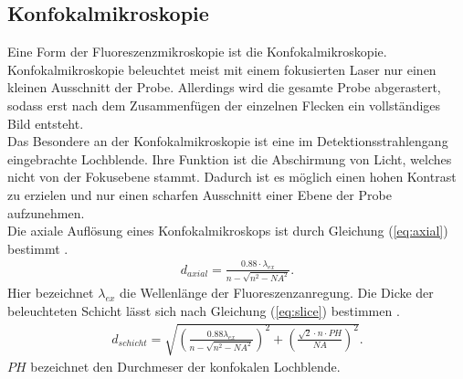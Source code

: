 \subsection{Konfokalmikroskopie}
Eine Form der Fluoreszenzmikroskopie ist die Konfokalmikroskopie. 
Konfokalmikroskopie beleuchtet meist mit einem fokusierten Laser nur einen kleinen Ausschnitt der Probe. Allerdings wird die gesamte Probe abgerastert, sodass erst nach dem Zusammenfügen der einzelnen Flecken ein vollständiges Bild entsteht.
\\
Das Besondere an der Konfokalmikroskopie ist eine im Detektionsstrahlengang eingebrachte Lochblende. Ihre Funktion ist die Abschirmung von Licht, welches nicht von der Fokusebene stammt. Dadurch ist es möglich einen hohen Kontrast zu erzielen und nur einen scharfen Ausschnitt einer Ebene der Probe aufzunehmen.
\\
Die axiale Auflösung eines Konfokalmikroskops ist durch Gleichung (\ref{eq:axial}) bestimmt \cite{beyer}.
\begin{align}
	d_{axial} = \frac{0.88\cdot \lambda_{ex}}{n-\sqrt{n^2-NA^2}}. \label{eq:axial}
\end{align}
Hier bezeichnet $\lambda_{ex}$ die Wellenlänge der Fluoreszenzanregung. 
Die Dicke der beleuchteten Schicht lässt sich nach Gleichung (\ref{eq:slice}) bestimmen \cite{beyer}.
\begin{align}
	d_{schicht} = \sqrt{\left( \frac{0.88\lambda_{ex}}{n-\sqrt{n^2-NA^2}}\right)^2 + \left( \frac{\sqrt{2}\cdot n \cdot PH}{NA}\right)^2}. \label{eq:slice}
\end{align}
$PH$ bezeichnet den Durchmeser der konfokalen Lochblende.
